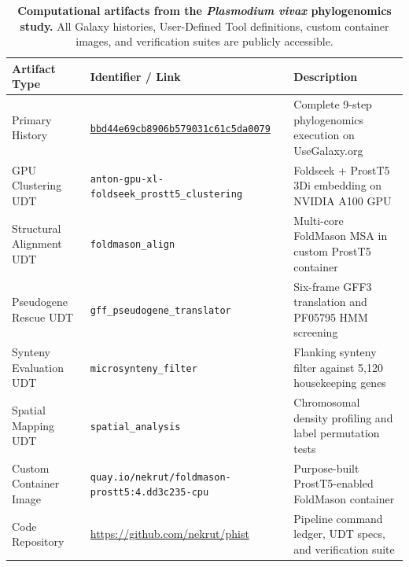 \documentclass[11pt,letterpaper]{article}
\begin{document}
\clearpage

\begin{table}[!htbp]
\centering
\small
\begin{tabularx}{\textwidth}{llX}
\toprule
\textbf{Artifact Type} & \textbf{Identifier / Link} & \textbf{Description} \\
\midrule
Primary History & \href{https://usegalaxy.org/histories/view?id=bbd44e69cb8906b579031c61c5da0079}{\texttt{bbd44e69cb8906b579031c61c5da0079}} & Complete 9-step phylogenomics execution on UseGalaxy.org \\
GPU Clustering UDT & \texttt{anton-gpu-xl-foldseek\_prostt5\_clustering} & Foldseek + ProstT5 3Di embedding on NVIDIA A100 GPU \\
Structural Alignment UDT & \texttt{foldmason\_align} & Multi-core FoldMason MSA in custom ProstT5 container \\
Pseudogene Rescue UDT & \texttt{gff\_pseudogene\_translator} & Six-frame GFF3 translation and PF05795 HMM screening \\
Synteny Evaluation UDT & \texttt{microsynteny\_filter} & Flanking synteny filter against 5,120 housekeeping genes \\
Spatial Mapping UDT & \texttt{spatial\_analysis} & Chromosomal density profiling and label permutation tests \\
Custom Container Image & \texttt{quay.io/nekrut/foldmason-prostt5:4.dd3c235-cpu} & Purpose-built ProstT5-enabled FoldMason container \\
Code Repository & \url{https://github.com/nekrut/phist} & Pipeline command ledger, UDT specs, and verification suite \\
\bottomrule
\end{tabularx}
\caption{\textbf{Computational artifacts from the \textit{Plasmodium vivax} phylogenomics study.} All Galaxy histories, User-Defined Tool definitions, custom container images, and verification suites are publicly accessible.}
\label{tab:case2_artifacts}
\end{table}

\clearpage
\end{document}
